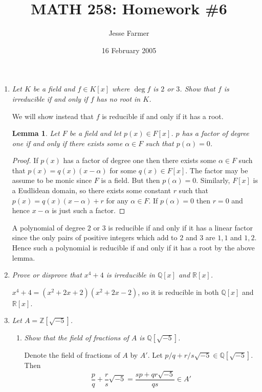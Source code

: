 \documentclass[10pt]{article}
\title{MATH 258: Homework \#6}
\author{Jesse Farmer}
\date{16 February 2005}
\newcommand{\Z}{\mathbb{Z}}
\newcommand{\Q}{\mathbb{Q}}
\newcommand{\R}{\mathbb{R}}
\newtheorem{lemma}{Lemma}
\begin{document}
\maketitle
\begin{enumerate}

\item \emph{Let $K$ be a field and $f \in K[x]$ where $\deg f$ is $2$ or $3$.  Show that $f$ is irreducible if and only if $f$ has no root in $K$.}

We will show instead that $f$ is reducible if and only if it has a root.

\begin{lemma}\label{linear_factor} Let $F$ be a field and let $p(x) \in F[x]$.  $p$ has a factor of degree one if and only if there exists some $\alpha \in F$ such that $p(\alpha) = 0$.
\end{lemma}

\begin{proof}If $p(x)$ has a factor of degree one then there exists some $\alpha \in F$ such that $p(x)=q(x)(x-\alpha)$ for some $q(x) \in F[x]$.  The factor may be assume to be monic since $F$ is a field.  But then $p(\alpha) = 0$.  Similarly, $F[x]$ is a Eudlidean domain, so there exists some constant $r$ such that $p(x) = q(x)(x-\alpha)  + r$ for any $\alpha \in F$.  If $p(\alpha) = 0$ then $r = 0$ and hence $x-\alpha$ is just such a factor.
\end{proof}

A polynomial of degree $2$ or $3$ is reducible if and only if it has a linear factor since the only pairs of positive integers which add to $2$ and $3$ are $1,1$ and $1,2$.  Hence such a polynomial is reducible if and only if it has a root by the above lemma.

\item \emph{Prove or disprove that $x^4 + 4$ is irreducible in $\Q[x]$ and $\R[x]$.}

$x^4 + 4 = (x^2 + 2x + 2)(x^2+2x-2)$, so it is reducible in both $\Q[x]$ and $\R[x]$.

\item \emph{Let $A = \Z[\sqrt{-5}]$.}
\begin{enumerate}
\item \emph{Show that the field of fractions of $A$ is $\Q[\sqrt{-5}]$.}

Denote the field of fractions of $A$ by $A'$.  Let $p/q + r/s \sqrt{-5} \in \Q[\sqrt{-5}]$.  Then $$\frac{p}{q} + \frac{r}{s} \sqrt{-5} = \frac{sp + qr\sqrt{-5}}{qs} \in A'$$


\end{enumerate}
\end{enumerate}
\end{document}
